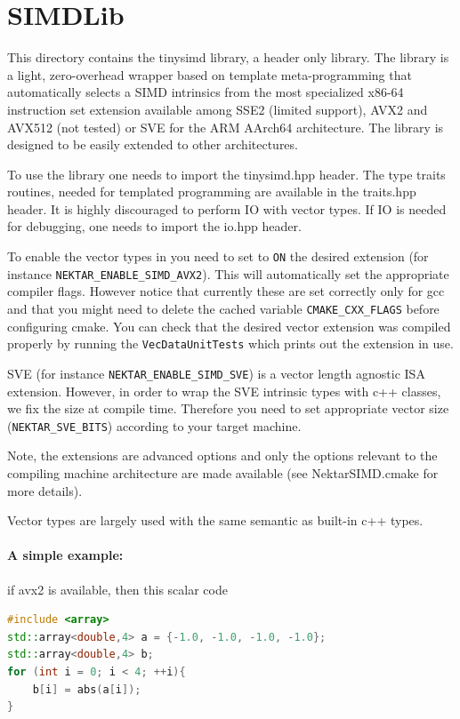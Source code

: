 %
\section{SIMDLib}
\label{sec:simdlib}

This directory contains the tinysimd library, a header only library.
The library is a light, zero-overhead wrapper based on template meta-programming that automatically selects a SIMD intrinsics from the most specialized x86-64 instruction set extension available among SSE2 (limited support), AVX2 and AVX512 (not tested) or SVE for the ARM AArch64 architecture.
The library is designed to be easily extended to other architectures.

To use the library one needs to import the tinysimd.hpp header.
The type traits routines, needed for templated programming are available in the traits.hpp header.
It is highly discouraged to perform IO with vector types. If IO is needed for debugging, one needs to import the io.hpp header.

To enable the vector types in {\nek} you need to set to \verb+ON+ the desired extension (for instance \verb+NEKTAR_ENABLE_SIMD_AVX2+).
This will automatically set the appropriate compiler flags. However notice that currently these are set correctly only for gcc and that you might need to delete the cached variable \verb+CMAKE_CXX_FLAGS+ before configuring cmake.
You can check that the desired vector extension was compiled properly by running the \verb+VecDataUnitTests+ which prints out the extension in use.

SVE (for instance \verb+NEKTAR_ENABLE_SIMD_SVE+) is a vector length agnostic ISA extension.
However, in order to wrap the SVE intrinsic types with c++ classes, we fix the size at compile time.
Therefore you need to set appropriate vector size (\verb+NEKTAR_SVE_BITS+) according to your target machine.

Note, the extensions are advanced options and only the options relevant to the compiling machine architecture are made available (see NektarSIMD.cmake for more details).

Vector types are largely used with the same semantic as built-in c++ types.

\paragraph{A simple example: } if avx2 is available, then this scalar code
\begin{lstlisting}[language=C++]
#include <array>
std::array<double,4> a = {-1.0, -1.0, -1.0, -1.0};
std::array<double,4> b;
for (int i = 0; i < 4; ++i){
    b[i] = abs(a[i]);
}
\end{lstlisting}

